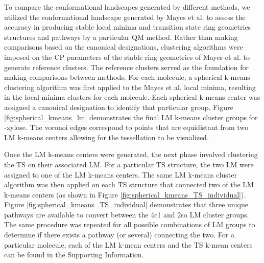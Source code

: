 \documentclass{article}
\begin{document}
To compare the conformational landscapes generated by different methods, we utilized the 
conformational landscape generated by Mayes et al. \cite{Mayes2014} to assess the accuracy in producing stable local minima and transition state
ring geometries structures and pathways by a particular QM method. Rather than making comparisons based on the canonical designations, 
clustering algorithms were imposed on the CP parameters of the stable ring geometries of Mayes et al. to generate reference clusters. The reference
clusters served as the foundation for making comparisons between methods. For each molecule, a spherical k-means clustering algorithm\cite{Laska2016} 
was first applied to the Mayes et al. local minima, resulting in the local minima clusters for each molecule. Each spherical k-means
center was assigned a canonical designation to identify that particular group. Figure \ref{fig:spherical_kmeans_lm} demonstrates the final LM k-means 
cluster groups for \textbeta-xylose. The voronoi edges correspond to points that are equidistant from two LM k-means centers allowing for the tessellation 
to be visualized. 

Once the LM k-means centers were generated, the next phase involved clustering the TS on their associated LM. 
For a particular TS structure, the two LM were assigned to one of the LM k-means centers. The
same LM k-means cluster algorithm\cite{Laska2016} was then applied on each TS structure that connected two of the LM k-means 
centers (as shown in Figure \ref{fig:spherical_kmeans_TS_individual}). Figure \ref{fig:spherical_kmeans_TS_individual} demonstrates that three
unique pathways are available to convert between the 4c1 and 2so LM cluster groups. The same procedure was repeated for all possible combinations 
of LM groups to determine if there exists a pathway (or several) connecting the two. For a particular molecule, each of the LM k-mean centers 
and the TS k-mean centers can be found in the Supporting Information.
\end{document}
